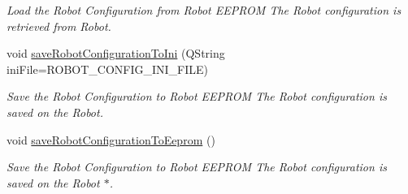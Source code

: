\begin{DoxyCompactItemize}
\begin{DoxyCompactList}\small\item\em Load the Robot Configuration from Robot E\-E\-P\-R\-O\-M The Robot configuration is retrieved from Robot. \end{DoxyCompactList}\item 
void \hyperlink{classroboctrl_1_1_robo_controller_s_d_k_ae032c7eaf9f1074a4f301f04fb30209d}{save\-Robot\-Configuration\-To\-Ini} (Q\-String ini\-File=R\-O\-B\-O\-T\-\_\-\-C\-O\-N\-F\-I\-G\-\_\-\-I\-N\-I\-\_\-\-F\-I\-L\-E)
\begin{DoxyCompactList}\small\item\em Save the Robot Configuration to Robot E\-E\-P\-R\-O\-M The Robot configuration is saved on the Robot. \end{DoxyCompactList}\item 
\hypertarget{classroboctrl_1_1_robo_controller_s_d_k_ae267786e376768c29a3f23bb089ba70c}{void \hyperlink{classroboctrl_1_1_robo_controller_s_d_k_ae267786e376768c29a3f23bb089ba70c}{save\-Robot\-Configuration\-To\-Eeprom} ()}\label{classroboctrl_1_1_robo_controller_s_d_k_ae267786e376768c29a3f23bb089ba70c}

\begin{DoxyCompactList}\small\item\em Save the Robot Configuration to Robot E\-E\-P\-R\-O\-M The Robot configuration is saved on the Robot $\ast$. \end{DoxyCompactList}\end{DoxyCompactItemize}
